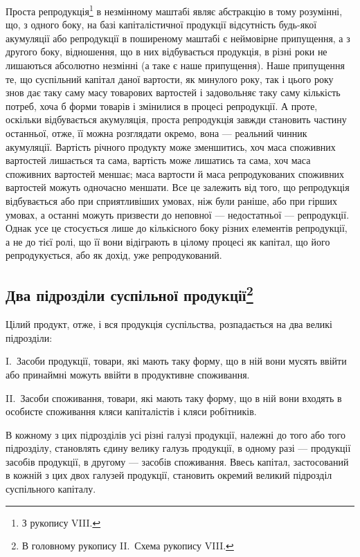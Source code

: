 Проста репродукція\footnote{
З рукопису VIII.
} в незмінному маштабі являє абстракцію в тому
розумінні, що, з одного боку, на базі капіталістичної продукції відсутність
будь-якої акумуляції або репродукції в поширеному маштабі є
неймовірне припущення, а з другого боку, відношення, що в них відбувається
продукція, в різні роки не лишаються абсолютно незмінні (а таке
є наше припущення). Наше припущення те, що суспільний капітал даної
вартости, як минулого року, так і цього року знов дає таку саму масу товарових вартостей і
задовольняє таку саму кількість потреб, хоча б форми товарів і змінилися в процесі репродукції. А
проте, оскільки відбувається акумуляція, проста репродукція завжди становить частину останньої,
отже, її можна розглядати окремо, вона — реальний чинник акумуляції. Вартість річного продукту може
зменшитись, хоч маса споживних вартостей лишається та сама, вартість може лишатись та сама, хоч маса
споживних вартостей меншає; маса вартости й маса репродукованих
споживних вартостей можуть одночасно меншати. Все це залежить
від того, що репродукція відбувається або при сприятливіших умовах,
ніж були раніше, або при гірших умовах, а останні можуть призвести до
неповної — недостатньої — репродукції. Однак усе це стосується лише до
кількісного боку різних елементів репродукції, а не до тієї ролі, що її
вони відіграють в цілому процесі як капітал, що його репродукується,
або як дохід, уже репродукований.

\subsection{Два підрозділи суспільної продукції\footnote{
В головному рукопису II.~Схема рукопису VIII.
}}

Цілий продукт, отже, і вся продукція суспільства, розпадається на
два великі підрозділи:

I.~Засоби продукції, товари, які мають таку форму, що в ній
вони мусять ввійти або принаймні можуть ввійти в продуктивне споживання.

II.~Засоби споживання, товари, які мають таку форму, що в
ній вони входять в особисте споживання кляси капіталістів і кляси робітників.

В кожному з цих підрозділів усі різні галузі продукції, належні до
того або того підрозділу, становлять єдину велику галузь продукції,
в одному разі — продукції засобів продукції, в другому — засобів споживання.
Ввесь капітал, застосований в кожній з цих двох галузей продукції,
становить окремий великий підрозділ суспільного капіталу.

